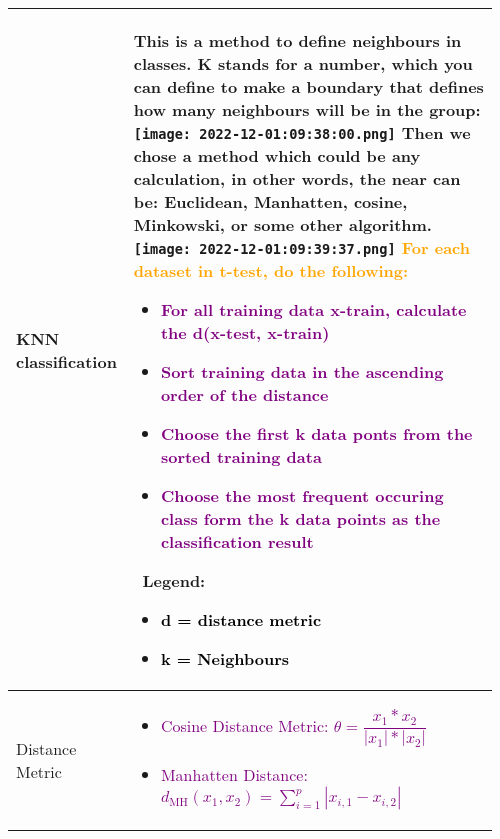 \documentclass[main.tex,fontsize=8pt,paper=a4,paper=portrait,DIV=calc,]{scrartcl}
\begin{document}
\begin{table}[ht!]
\begin{tabular}{|m{0.2\linewidth}|m{0.755\linewidth}|}
\hline
KNN classification & 
This is a method to define neighbours in classes. \newline
K stands for a number, which you can define to make a boundary that defines how many neighbours will be in the group:\newline
\texttt{[image: 2022-12-01:09:38:00.png]}\newline
Then we chose a method which could be any calculation,\newline
in other words, the \textbf{near} can be: \textbf{Euclidean, Manhatten, cosine, Minkowski, or some other algorithm}.\newline
\texttt{[image: 2022-12-01:09:39:37.png]}\newline
\textcolor{orange}{For each dataset in t-test, do the following:}\newline
\begin{itemize}
\item \textcolor{purple}{For all training data x-train, calculate the d(x-test, x-train)}
\item \textcolor{purple}{Sort training data in the ascending order of the distance}
\item \textcolor{purple}{Choose the first k data ponts from the sorted training data}
\item \textcolor{purple}{Choose the most frequent occuring class form the k data points as the classification result}
\end{itemize} 
\, \newline
Legend:\newline
\begin{itemize}
\item \textcolor{black}{d = distance metric}
\item \textcolor{black}{k = Neighbours}
\vspace{-3mm}
\end{itemize}\\ 
\hline
Distance Metric &
\vspace{2mm}
\large
\begin{itemize}
  \item \textcolor{purple}{Cosine Distance Metric: \( \theta = \dfrac{x_1 * x_2}{|x_1| * |x_2|} \)}\newline
    \, \newline
  \item \textcolor{purple}{Manhatten Distance: \( d_\text{MH}(x_1,x_2)= \sum_{i=1}^{p} | x_{i,1} - x_{i,2} | \)}\newline

\end{itemize}
\end{tabular}
\end{table}
\end{document}
